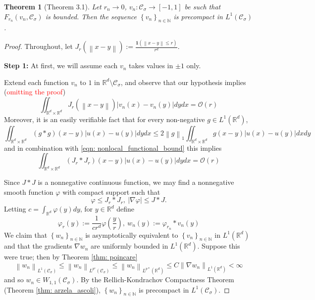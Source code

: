 \documentclass{article}
\newcommand{\Reals}{\mathbb{R}}
\newcommand{\norm}[1]{\left\lVert#1\right\rVert}
\newcommand{\abs}[1]{\left \lvert #1 \right \rvert}
\newcommand{\set}[1]{\left\{#1\right\}}
\newcommand{\seq}[1]{\set{#1}_{n \in \N}}
\newcommand{\N}{\mathbb{N}}
\newcommand{\Cset}{\mathcal{C}}
\newcommand{\Csig}{\Cset_{\sigma}}
\newcommand{\1}{\mathbf{1}}
\theoremstyle{alden}
\theoremstyle{aldenthm}
\newtheorem{theorem}{Theorem}
\theoremstyle{remark}
\begin{document}
\begin{theorem}[Theorem 3.1]
	Let $r_n \to 0$, $v_{n}: \Csig \to [-1,1]$ be such that $F_{r_n}(v_n, \Csig)$ is bounded. Then the sequence $\seq{v_n}$ is precompact in $L^1(\Csig)$. 
\end{theorem}
\begin{proof}
	Throughout, let  $J_r(\norm{x - y}) := \frac{\1(\norm{x - y} \leq r)}{r^d}$. 
	\item
	
	\textbf{Step 1:} At first, we will assume each $v_n$ takes values in $\pm1$ only. 
	
	Extend each function $v_n$ to $1$ in $\Reals^d \setminus \Csig$, and observe that our hypothesis implies (\textcolor{red}{omitting the proof})
	\begin{equation}
	\label{eqn: nonlocal_functional_bound}
	\iint_{\Reals^d \times \Reals^d} J_r(\norm{x - y}) \abs{v_n(x) - v_n(y)} dy dx = \mathcal{O}(r)
	\end{equation} 
	Moreover, it is an easily verifiable fact that for every non-negative $g \in L^1(\Reals^d)$,
	\begin{equation*}
	\iint_{\Reals^d \times \Reals^d} (g \ast g)(x - y) \abs{u(x) - u(y)} dy dx \leq 2 \norm{g}_1 \iint_{\Reals^d \times \Reals^d} g(x - y) \abs{u(x) - u(y)} dx dy
	\end{equation*}
	and in combination with \eqref{eqn: nonlocal_functional_bound} this implies
	\begin{equation}
	\label{eqn: nonlocal_functional_bound_1}
	\iint_{\Reals^d \times \Reals^d} (J_r \ast J_r)(x - y) \abs{u(x) - u(y)} dy dx = \mathcal{O}(r)
	\end{equation}
	
	Since $J \ast J$ is a nonnegative continuous function, we may find a nonnegative smooth function $\varphi$ with compact support such that
	\begin{equation}
	\label{eqn: varphi}
	\varphi \leq J_r \ast J_r,~ \abs{\nabla \varphi} \leq J \ast J.
	\end{equation}
	Letting $c = \int_{\Reals^d} \varphi(y) dy$, for $y \in \Reals^d$ define
	\begin{equation*}
	\varphi_r(y) := \frac{1}{cr^d} \varphi\left(\frac{y}{r}\right),~ w_n(y) := \varphi_{r_n} \ast v_n(y)
	\end{equation*}
	We claim that $\seq{w_n}$ is asymptotically equivalent to $\seq{v_n}$ in $L^1(\Reals^d)$ and that the gradients $\nabla{w_n}$ are uniformly bounded in $L^1(\Reals^d)$. Suppose this were true; then by Theorem \ref{thm: poincare}
	\begin{equation*}
	\norm{w_n}_{L^1(\Csig)} \leq \norm{w_n}_{L^{p^{\star}}(\Csig)} \leq \norm{w_n}_{L^{p*}(\Reals^d)} \leq C \norm{\nabla w_n}_{L^1(\Reals^d)} < \infty
	\end{equation*}
	and so $w_n \in W_{1,1}(\Csig)$. By the Rellich-Kondrachov Compactness Theorem (Theorem \ref{thm: arzela_ascoli}), $\seq{w_n}$ is precompact in $L^1(\Csig)$.
	

\end{proof}
\end{document}
